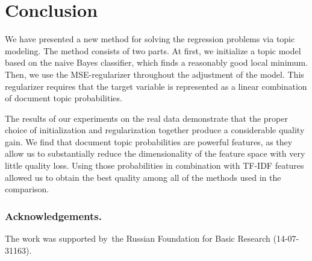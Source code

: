 \documentclass{sig-alternate-2013}
\begin{document}
\section{Conclusion}

We have presented a new method for solving the regression problems via topic modeling.
The method consists of two parts.
At first, we initialize a topic model based on the naive Bayes classifier, which finds a reasonably good local minimum.
Then, we use the MSE-regularizer throughout the adjustment of the model.
This regularizer requires that the target variable is represented as a linear combination of document topic probabilities.


The results of our experiments on the real data demonstrate that the proper choice of initialization and regularization
together produce a considerable quality gain.
We find that document topic probabilities are powerful features, as they allow
us to substantially reduce the dimensionality of the feature space with very little quality loss.
Using those probabilities in combination with TF-IDF features allowed us to obtain
the best quality among all of the methods used in the comparison.

\bigskip
\subsubsection*{Acknowledgements.}
\nopagebreak
The work was supported by~the Russian Foundation for Basic Research (14-07-31163).
\end{document}
